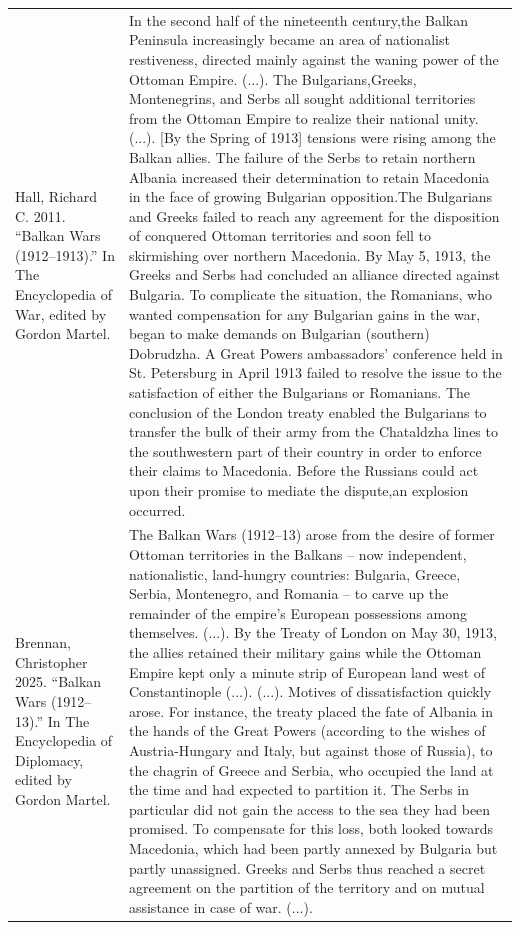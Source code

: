 {\begin{longtable}{p{}p{}}
\\
Hall, Richard C. 2011. “Balkan Wars (1912–1913).” In The Encyclopedia of War, edited by Gordon Martel. & In the second half of the nineteenth century,the Balkan Peninsula increasingly became an area of nationalist restiveness, directed mainly against the waning power of the Ottoman Empire. (...). The Bulgarians,Greeks, Montenegrins, and Serbs all sought additional territories from the Ottoman Empire to realize their national unity. (...).
[By the Spring of 1913] tensions were rising among the Balkan allies. The failure of the Serbs to retain northern Albania increased their determination to retain Macedonia in the face of growing Bulgarian opposition.The Bulgarians and Greeks failed to reach any agreement for the disposition of conquered Ottoman territories and soon fell to skirmishing over northern Macedonia. By May 5, 1913, the Greeks and Serbs had concluded an alliance directed against Bulgaria. To complicate the situation, the Romanians, who wanted compensation for any Bulgarian gains in the war, began to make demands on Bulgarian (southern) Dobrudzha. A Great Powers ambassadors' conference held in St. Petersburg in April 1913 failed to resolve the issue to the satisfaction of either the Bulgarians or Romanians. The conclusion of the London treaty enabled the Bulgarians to transfer the bulk of their army from the Chataldzha lines to the southwestern part of their country in order to enforce their claims to Macedonia. Before the Russians could act upon their promise to mediate the dispute,an explosion occurred.
\\
Brennan, Christopher 2025. “Balkan Wars (1912–13).” In The Encyclopedia of Diplomacy, edited by Gordon Martel. & The Balkan Wars (1912–13) arose from the desire of former Ottoman territories in the Balkans – now independent, nationalistic, land-hungry countries: Bulgaria, Greece, Serbia, Montenegro, and Romania – to carve up the remainder of the empire's European possessions among themselves. (...).
By the Treaty of London on May 30, 1913, the allies retained their military gains while the Ottoman Empire kept only a minute strip of European land west of Constantinople (...). (...). Motives of dissatisfaction quickly arose. For instance, the treaty placed the fate of Albania in the hands of the Great Powers (according to the wishes of Austria-Hungary and Italy, but against those of Russia), to the chagrin of Greece and Serbia, who occupied the land at the time and had expected to partition it. The Serbs in particular did not gain the access to the sea they had been promised. To compensate for this loss, both looked towards Macedonia, which had been partly annexed by Bulgaria but partly unassigned. Greeks and Serbs thus reached a secret agreement on the partition of the territory and on mutual assistance in case of war. (...).

\end{longtable}}
